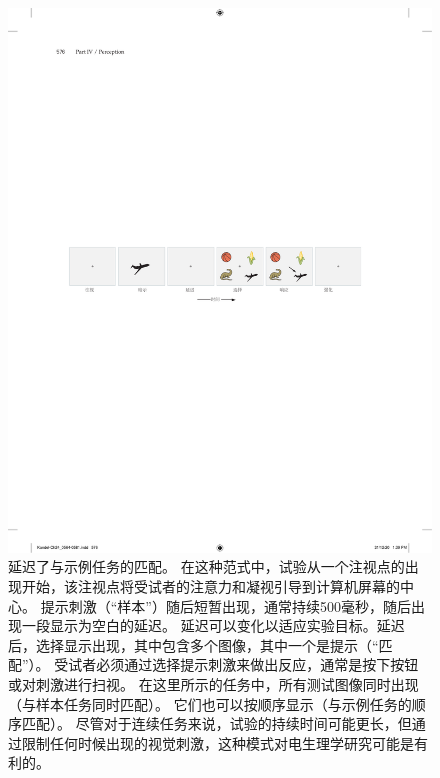 \begin{figure}[htbp]
	\centering
	\includegraphics[width=1.0\linewidth]{chap24/fig_24_10_A}
	\caption{延迟了与示例任务的匹配。
		在这种范式中，试验从一个注视点的出现开始，该注视点将受试者的注意力和凝视引导到计算机屏幕的中心。
		提示刺激（“样本”）随后短暂出现，通常持续500毫秒，随后出现一段显示为空白的延迟。
		延迟可以变化以适应实验目标。延迟后，选择显示出现，其中包含多个图像，其中一个是提示（“匹配”）。
		受试者必须通过选择提示刺激来做出反应，通常是按下按钮或对刺激进行扫视。
		在这里所示的任务中，所有测试图像同时出现（与样本任务同时匹配）。
		它们也可以按顺序显示（与示例任务的顺序匹配）。
		尽管对于连续任务来说，试验的持续时间可能更长，但通过限制任何时候出现的视觉刺激，这种模式对电生理学研究可能是有利的。}
	\label{fig:24_10_a}
\end{figure}


